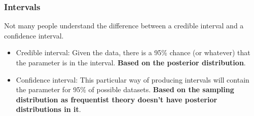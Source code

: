 \documentclass{beamer}
\begin{document}
\begin{frame}
\frametitle{Intervals}
Not many people understand the difference between a credible interval and
a confidence interval.\pause

\begin{itemize}
\item Credible interval: Given the data, there is a 95\% chance (or whatever)
that the parameter is in the interval. {\bf Based on the posterior distribution}.\pause
\item Confidence interval: This particular way of producing intervals will
contain the parameter for 95\% of possible datasets.
{\bf Based on the sampling distribution as frequentist theory doesn't have
posterior distributions in it}.
\end{itemize}

\end{frame}
\end{document}
